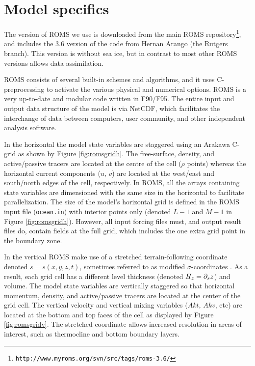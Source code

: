 \section{Model specifics}
\label{sec:setup}
The version of ROMS we use is downloaded from the main ROMS repository\footnote{\texttt{http://www.myroms.org/svn/src/tags/roms-3.6/}}, and includes the 3.6 version of the code from Hernan Arango (the Rutgers branch). This version is without sea ice, but in contrast to most other ROMS versions allows data assimilation.

ROMS consists of several built-in schemes and algorithms, and it uses C-preprocessing to activate the various physical and numerical options. ROMS is a very up-to-date and modular code written in F90/F95. The entire input and output data structure of the model is via NetCDF, which facilitates the interchange of data between computers, user community, and other independent analysis software.

In the horizontal the model state variables are staggered using an Arakawa C-grid as shown by Figure \ref{fig:romsgridh}. The free-surface, density, and active/passive tracers are located at the centre of the cell ($\rho$ points) whereas the horizontal current components ($u$, $v$) are located at the west/east and south/north edges of the cell, respectively. In ROMS, all the arrays containing state variables are dimensioned with the same size in the horizontal to facilitate parallelization. The size of the model's horizontal grid is defined in the ROMS input file (\texttt{ocean.in}) with interior points only (denoted $L-1$ and $M-1$ in Figure \ref{fig:romsgridh}). However, all input forcing files must, and output result files do, contain fields at the full grid, which includes the one extra grid point in the boundary zone.


In the vertical ROMS make use of a stretched terrain-following coordinate denoted $s=s(x,y,z,t)$, sometimes referred to as modified $\sigma$-coordinates \citep{song:haidv:1994}. As a result, each grid cell has a different level thickness (denoted $H_z = \partial_{s} z$) and volume. The model state variables are vertically staggered so that horizontal momentum, density, and active/passive tracers are located at the center of the grid cell. The vertical velocity and vertical mixing variables ($Akt$, $Akv$, etc) are located at the bottom and top faces of the cell as displayed by Figure \ref{fig:romsgridv}. The stretched coordinate allows increased resolution in areas of interest, such as thermocline and bottom boundary layers. 


